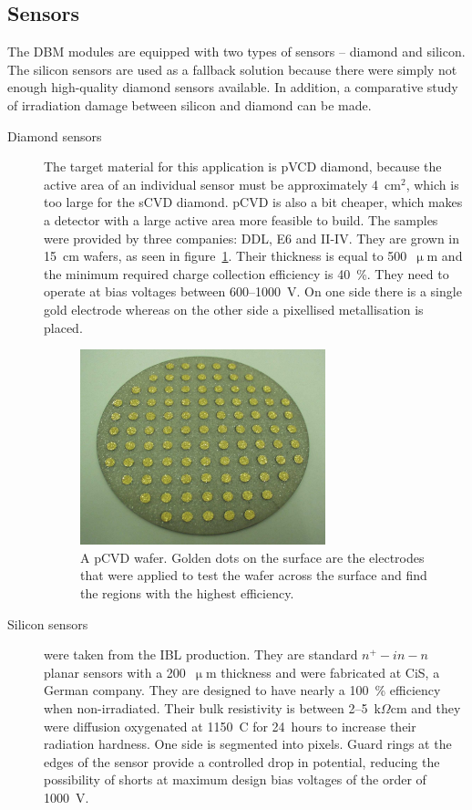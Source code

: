 \documentclass[12pt]{packages/mytustyle}  %
\begin{document}
\subsection{Sensors}
The DBM modules are equipped with two types of sensors -- diamond and silicon. The silicon sensors are used as a fallback solution because there were simply not enough high-quality diamond sensors available. In addition, a comparative study of irradiation damage between silicon and diamond can be made.

 
\begin{description}
\item[Diamond sensors] The target material for this application is pVCD diamond, because the active area of an individual sensor must be approximately 4~cm$^2$, which is too large for the sCVD diamond. pCVD is also a bit cheaper, which makes a detector with a large active area more feasible to build. The samples were provided by three companies: DDL, E6 and II-IV. They are grown in 15~cm wafers, as seen in figure~\ref{fig:wafer}. Their thickness is equal to 500~$\upmu$m and the minimum required charge collection efficiency is 40~\%. They need to operate at bias voltages between 600--1000~V. On one side there is a single gold electrode whereas on the other side a pixellised metallisation is placed. 
\begin{figure}[!t]
\centering
\includegraphics[width=0.7\textwidth]{pics/wafer}
\caption{A pCVD wafer. Golden dots on the surface are the electrodes that were applied to test the wafer across the surface and find the regions with the highest efficiency.}
\label{fig:wafer}
\end{figure}
\item[Silicon sensors] were taken from the IBL production. They are standard $n^+ - in - n$ planar sensors with a 200~$\upmu$m thickness and were fabricated at CiS, a German company. They are designed to have nearly a 100~\% efficiency when non-irradiated. Their bulk resistivity is between 2--5~k$\Omega$cm and they were diffusion oxygenated at 1150~\textdegree C for 24~hours to increase their radiation hardness. One side is segmented into pixels. Guard rings at the edges of the sensor provide a controlled drop in potential, reducing the possibility of shorts at maximum design bias voltages of the order of 1000~V.
\end{description}
\end{document}

